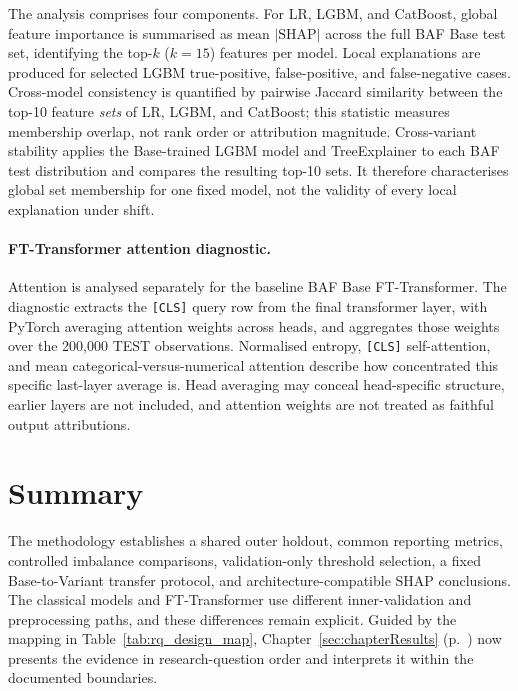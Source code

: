 The analysis comprises four components. For LR, LGBM, and CatBoost, global feature importance is summarised as mean $|\text{SHAP}|$ across the full BAF Base test set, identifying the top-$k$ ($k=15$) features per model. Local explanations are produced for selected LGBM true-positive, false-positive, and false-negative cases. Cross-model consistency is quantified by pairwise Jaccard similarity between the top-10 feature \emph{sets} of LR, LGBM, and CatBoost; this statistic measures membership overlap, not rank order or attribution magnitude. Cross-variant stability applies the Base-trained LGBM model and TreeExplainer to each BAF test distribution and compares the resulting top-10 sets. It therefore characterises global set membership for one fixed model, not the validity of every local explanation under shift.

\paragraph{FT-Transformer attention diagnostic.}
Attention is analysed separately for the baseline BAF Base FT-Transformer. The diagnostic extracts the \texttt{[CLS]} query row from the final transformer layer, with PyTorch averaging attention weights across heads, and aggregates those weights over the 200,000 TEST observations. Normalised entropy, \texttt{[CLS]} self-attention, and mean categorical-versus-numerical attention describe how concentrated this specific last-layer average is. Head averaging may conceal head-specific structure, earlier layers are not included, and attention weights are not treated as faithful output attributions.

\section{Summary}
\label{sec:methodology_summary}

The methodology establishes a shared outer holdout, common reporting metrics, controlled imbalance comparisons, validation-only threshold selection, a fixed Base-to-Variant transfer protocol, and architecture-compatible SHAP conclusions. The classical models and FT-Transformer use different inner-validation and preprocessing paths, and these differences remain explicit. Guided by the mapping in Table~\ref{tab:rq_design_map}, Chapter~\ref{sec:chapterResults} (p.~\pageref{sec:chapterResults}) now presents the evidence in research-question order and interprets it within the documented boundaries.
